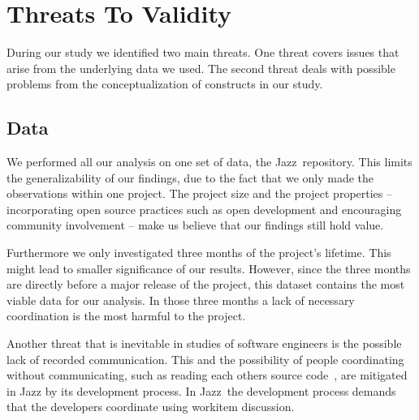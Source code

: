 \documentclass{sig-alternate}
\begin{document}




\section{Threats To Validity}
\label{subsec:threats}
During our study we identified two main threats. 
One threat covers issues that arise from the underlying data we used.
The second threat deals with possible problems from the conceptualization of
constructs in our study.

\subsection{Data}
We performed all our analysis on one set of data, the Jazz\texttrademark\
repository. This limits the generalizability of our findings, due to the fact
that we only made the observations within one project. The  
project size and the project properties -- incorporating open
source practices such as open development and encouraging community involvement
-- make us believe that our findings still hold value.

Furthermore we only investigated three months of the project's lifetime. This
might lead to smaller significance of our results. However, since the three
months are directly before a major release of the project, this dataset contains
the most viable data for our analysis. In those three months a lack of necessary
coordination is the most harmful to the project.

Another threat that is inevitable in studies of software engineers is
the possible lack of recorded communication. This and the possibility of people
coordinating without communicating, such as reading each others source
code~\cite{bolici:stc:2009}, are mitigated in Jazz by its development process.
In Jazz\texttrademark\ the development process demands that the developers
coordinate using workitem discussion. 

\end{document}

